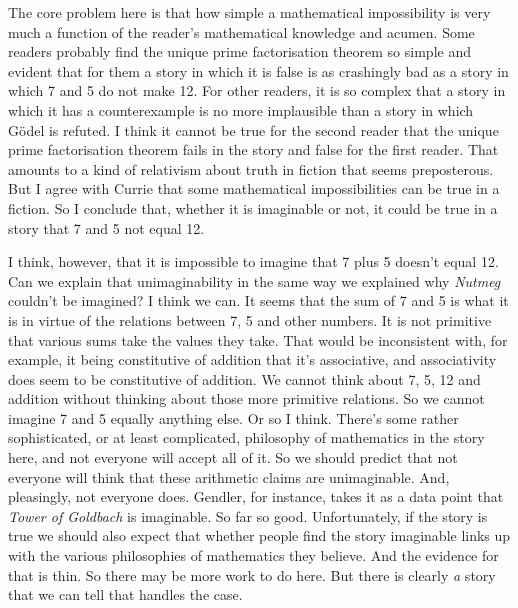 The core problem here is that how simple a mathematical impossibility is very much a function of the reader's mathematical knowledge and acumen. Some readers probably find the unique prime factorisation theorem so simple and evident that for them a story in which it is false is as crashingly bad as a story in which 7 and 5 do not make 12. For other readers, it is so complex that a story in which it has a counterexample is no more implausible than a story in which G\"odel is refuted. I think it cannot be true for the second reader that the unique prime factorisation theorem fails in the story and false for the first reader. That amounts to a kind of relativism about truth in fiction that seems preposterous. But I agree with Currie that some mathematical impossibilities can be true in a fiction. So I conclude that, whether it is imaginable or not, it could be true in a story that 7 and 5 not equal 12. 

I think, however, that it is impossible to imagine that 7 plus 5 doesn't equal 12. Can we explain that unimaginability in the same way we explained why \textit{Nutmeg }couldn't be imagined? I think we can. It seems that the sum of 7 and 5 is what it is in virtue of the relations between 7, 5 and other numbers. It is not primitive that various sums take the values they take. That would be inconsistent with, for example, it being constitutive of addition that it's associative, and associativity does seem to be constitutive of addition. We cannot think about 7, 5, 12 and addition without thinking about those more primitive relations. So we cannot imagine 7 and 5 equally anything else. Or so I think. There's some rather sophisticated, or at least complicated, philosophy of mathematics in the story here, and not everyone will accept all of it. So we should predict that not everyone will think that these arithmetic claims are unimaginable. And, pleasingly, not everyone does. Gendler, for instance, takes it as a data point that \textit{Tower of Goldbach }is imaginable. So far so good. Unfortunately, if the story is true we should also expect that whether people find the story imaginable links up with the various philosophies of mathematics they believe. And the evidence for that is thin. So there may be more work to do here. But there is clearly \textit{a }story that we can tell that handles the case. 